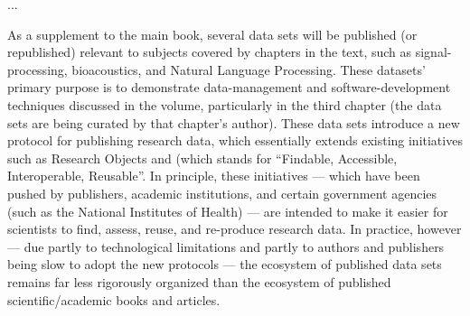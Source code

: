 \documentclass[11pt,letterpaper]{article}
\newcommand{\sectsp}{\vspace{12pt}}
\newcommand{\FAIR}{\resizebox{!}{7.5pt}{\AcronymText{FAIR}}}
\newcommand{\textscc}[1]{{\color{orr!35!black}{{%
						\fontfamily{Cabin-TLF}\fontseries{b}\selectfont{\textsc{\scriptsize{#1}}}}}}}
\newcommand{\AcronymText}[1]{{\textscc{#1}}}
\newcommand{\p}[1]{

\vspace{.85em}#1}
\newcommand{\q}[1]{{\fontfamily{qcr}\selectfont ``}#1{\fontfamily{qcr}\selectfont ''}}
\newcommand{\llMOSAIC}{\mbox{{\LARGE MOSAIC}}}
\newcommand{\llWC}{\mbox{{\LARGE WhiteCharmDB}}}
\newcommand{\lun}[1]{\raisebox{-4pt}{\fontfamily{qcr}\selectfont{%
\LARGE{\textbf{\textcolor{tcolor}{#1}}}}}\vspace{-2pt}}
\begin{document}
	
{\linespread{1.2}\selectfont

\vspace*{-7em}

\begin{center}


\vspace{1em}


\begin{tcolorbox}
[
arc=2pt,outer arc=0pt,
enhanced jigsaw,
width=.984\textwidth,
colback=ctmpppp!30,
colframe=logoRed!30!darkRed,
drop shadow=logoPurple!50!darkRed,
]
\begin{minipage}{\textwidth}	
\begin{center}		
{\setlength{\fboxsep}{19pt}
	}
\end{center}
\end{minipage}
\end{tcolorbox}
\end{center}

\vspace{-1.5em}

...
\p{As a supplement to the main book, 
several data sets will be published (or 
republished) relevant to subjects covered by 
chapters in the text, such as signal-processing, 
bioacoustics, and Natural Language Processing.  
These datasets' primary purpose is to demonstrate 
data-management and software-development techniques 
discussed in the volume, particularly in the 
third chapter (the data sets are being curated by that 
chapter's author).  These data sets introduce a new 
protocol for publishing research data, which essentially 
extends existing initiatives such as Research Objects 
and \FAIR{} (which stands for \q{Findable, Accessible, 
Interoperable, Reusable}.  In principle, these initiatives 
--- which have been pushed by publishers, academic 
institutions, and certain government agencies 
(such as the National Institutes of Health) --- are intended to make 
it easier for scientists to find, assess, 
reuse, and re-produce research data.  
In practice, however --- due partly to  
technological limitations and partly to 
authors and publishers being slow to adopt 
the new protocols --- the ecosystem of 
published data sets remains far less rigorously 
organized than the ecosystem of published 
scientific/academic books and articles.}

}
\end{document}
